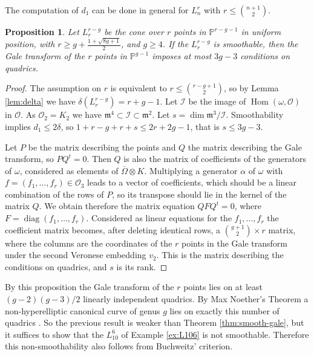 \documentclass{amsart}
\renewcommand{\P}{\mathbb{P}}
\newcommand {\m}{\mathfrak{m}}
\DeclareMathOperator{\Hom}{Hom}
\newcommand{\mO}{\mathcal{O}}
\newtheorem{prop}[thm]{Proposition}
\theoremstyle{definition}
\theoremstyle{remark}
\begin{document}
The computation of $d_1$ can be done in general for $L_n^r$ with $r\leq \binom{n+1}2$.


\begin{prop}
Let $L_r^{r-g}$ be the cone over $r$ points in $\P^{r-g-1}$ in uniform position, with
$r\geq g + \frac{1+\sqrt{8g+1}}2$, and $g\geq 4$.
If the $L_r^{r-g}$ is smoothable, then 
the Gale transform of the $r$ points  in $\P^{g-1}$ imposes at most $3g-3$ conditions on quadrics.
\end{prop}

\begin{proof}
The assumption on $r$  is equivalent to $r\leq \binom{r-g+1}2$, so by
Lemma \ref{lem:delta} we have $\delta (L_r^{r-g})=r+g-1$. 
Let $\mathcal I$ be the image of $\Hom(\omega,\mO)$ in $\mO$. 
As $\mO_2=K_2$ we have $\m^4\subset \mathcal I\subset \m^2$. 
Let $s=\dim \m^3/\mathcal I$. Smoothability implies  
$d_1\leq 2\delta$, so $1+r-g+r+s\leq 2r+2g-1$, that is $s\leq 3g-3$.

Let $P$ be the matrix describing the points and $Q$ the matrix describing the Gale transform,
so $PQ^t=0$. Then $Q$ is also the matrix of coefficients of the generators of $\omega$,
considered as elements of $\overline\Omega\otimes K$. Multiplying  
a generator $\alpha$ of $\omega$ with $f=(f_1,\dots,f_r)\in \mO_3$  leads to a vector of coefficients,
which should be a linear combination of the rows of $P$, so its transpose should lie
in the kernel of the matrix $Q$. We obtain therefore the matrix equation $QF Q^t=0$, where 
$F=\operatorname{diag}(f_1,\dots,f_r)$. Considered
as linear equations for the $f_1,\dots,f_r$ the coefficient matrix becomes, after deleting identical rows,
 a $\binom{g+1}2
\times r$ matrix, where the columns are the coordinates of the $r$ points in the Gale transform
under the second Veronese embedding $v_2$. This is the matrix describing the conditions
on quadrics, and $s$ is its rank.
\end{proof}

By this proposition the Gale transform of the $r$ points lies on at least $(g-2)(g-3)/2$
linearly independent quadrics.
By Max Noether's Theorem  a non-hyperelliptic canonical curve of genus $g$
lies on exactly this number of quadrics \cite[p. 117]{ACGH}. So the previous
result is weaker than Theorem  \ref{thm:smooth-gale}, but it suffices to show
that the $L_{10}^6$ of Example \ref{ex:L106} is not smoothable. Therefore
this non-smoothability also follows from Buchweitz' criterion.
 
\end{document}
